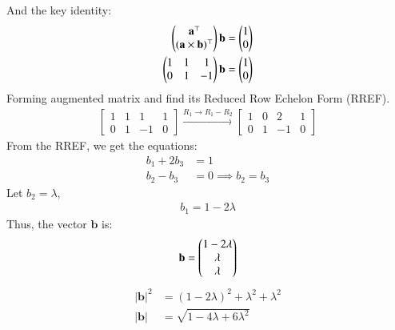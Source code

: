 \documentclass[journal]{IEEEtran}
\begin{document}
	And the key identity:
	\begin{align}
		\begin{pmatrix}\mathbf{a}^\top \\ (\mathbf{a} \times \mathbf{b})^\top\end{pmatrix}\mathbf{b} = \begin{pmatrix}1\\0\end{pmatrix}\\
		\begin{pmatrix}1 & 1 & 1\\0 & 1 & -1\end{pmatrix}\mathbf{b} = \begin{pmatrix}1\\0\end{pmatrix}
	\end{align}
Forming augmented matrix and find its Reduced Row Echelon Form (RREF).
	\begin{align}
		\left[ \begin{array}{ccc|c} 1 & 1 & 1 & 1 \\ 0 & 1 & -1 & 0 \end{array} \right]
		\xrightarrow{R_1 \rightarrow R_1 - R_2}
		\left[ \begin{array}{ccc|c} 1 & 0 & 2 & 1 \\ 0 & 1 & -1 & 0 \end{array} \right]
	\end{align}
From the RREF, we get the equations:
	\begin{align}
		b_1 + 2b_3 &= 1\\
		b_2 - b_3 &= 0 \implies b_2 = b_3
	\end{align}
Let $b_2 = \lambda$,
	\begin{align}
	b_1 = 1 - 2\lambda
	\end{align}
	Thus, the vector $\mathbf{b}$ is:
	\begin{align}
		\mathbf{b} = \begin{pmatrix}1 - 2\lambda\\\lambda\\\lambda\end{pmatrix}
	\end{align}
	\begin{align}
		|\mathbf{b}|^2 &= (1 - 2\lambda)^2 + \lambda^2 + \lambda^2\\
		|\mathbf{b}| &= \sqrt{1 - 4\lambda + 6\lambda^2}
	\end{align}

	
\end{document}
